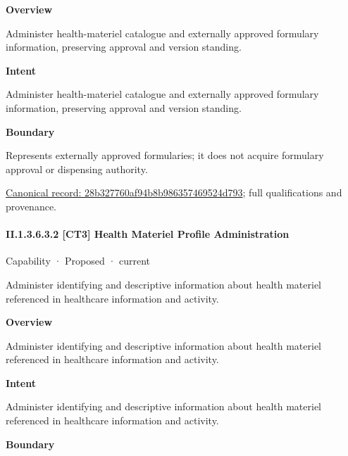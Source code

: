 \textbf{Overview}



Administer health-materiel catalogue and externally approved formulary information, preserving approval and version standing.



\textbf{Intent}



Administer health-materiel catalogue and externally approved formulary information, preserving approval and version standing.



\textbf{Boundary}



Represents externally approved formularies; it does not acquire formulary approval or dispensing authority.


{\footnotesize \href{../../../../continuum/strategy/capability/28b327760af94b8b986357469524d793.md}{Canonical record: 28b327760af94b8b986357469524d793}; full qualifications and provenance.}\par
\paragraph*{II.1.3.6.3.2 [CT3] Health Materiel Profile Administration}
\label{navigation:II.1.3.6.3.2}

\label{element:9626edae517d40d2bfae619860f18e20}
{\small Capability · Proposed · current}\par

Administer identifying and descriptive information about health materiel referenced in healthcare information and activity.



\textbf{Overview}



Administer identifying and descriptive information about health materiel referenced in healthcare information and activity.



\textbf{Intent}



Administer identifying and descriptive information about health materiel referenced in healthcare information and activity.



\textbf{Boundary}



